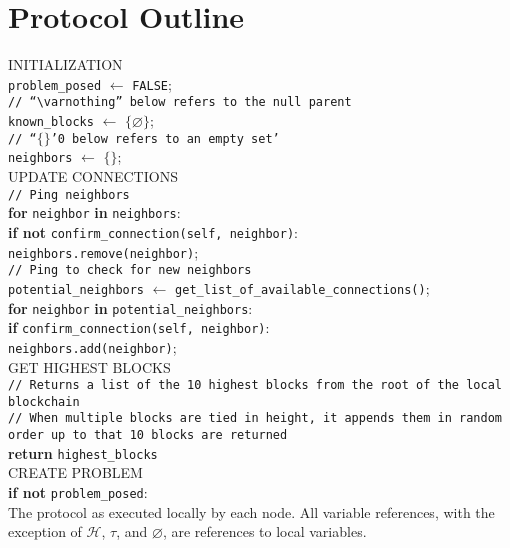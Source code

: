 \documentclass{article}
\begin{document}
\section*{Protocol Outline}
\begin{algorithm}[H]
	INITIALIZATION \\
		\hspace{5mm}\texttt{problem\_posed} $\gets$ \texttt{FALSE}; \\
		\hspace{5mm}\texttt{// ``$\varnothing$'' below refers to the null parent} \\
		\hspace{5mm}\texttt{known\_blocks} $\gets$ $\{\varnothing\}$; \\
		\hspace{5mm}\texttt{// ``$\{\}$'0 below refers to an empty set'} \\
		\hspace{5mm}\texttt{neighbors} $\gets$ $\{\}$; \\
	UPDATE CONNECTIONS \\
		\hspace{5mm}\texttt{// Ping neighbors} \\
		\hspace{5mm}\textbf{for} \texttt{neighbor} \textbf{in} \texttt{neighbors}: \\
		\hspace{10mm}\textbf{if not} \texttt{confirm\_connection(self, neighbor)}: \\
		\hspace{15mm}\texttt{neighbors.remove(neighbor)}; \\
		\hspace{5mm}\texttt{// Ping to check for new neighbors} \\
		\hspace{5mm}\texttt{potential\_neighbors} $\gets$  \texttt{get\_list\_of\_available\_connections()}; \\
		\hspace{5mm}\textbf{for} \texttt{neighbor} \textbf{in} \texttt{potential\_neighbors}: \\
		\hspace{10mm}\textbf{if} \texttt{confirm\_connection(self, neighbor)}: \\
		\hspace{15mm}\texttt{neighbors.add(neighbor)}; \\
	GET HIGHEST BLOCKS \\
		\hspace{5mm}\texttt{// Returns a list of the 10 highest blocks from the root of the
			local blockchain} \\
		\hspace{5mm}\texttt{// When multiple blocks are tied in height, it appends them in random order up to that 10 blocks are returned} \\
		\hspace{5mm}\textbf{return} \texttt{highest\_blocks} \\
	CREATE PROBLEM \\
		\hspace{5mm}\textbf{if not} \texttt{problem\_posed}: \\
		
	\caption{The protocol as executed locally by each node. All variable references,
		with the exception of $\mathcal{H}$, $\tau$, and $\varnothing$, are
		references to local variables.}
\end{algorithm}
\end{document}
